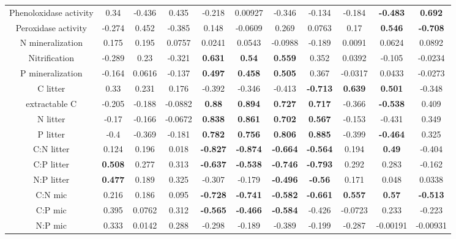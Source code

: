 \documentclass[authoryear,preprint,review,12pt]{elsarticle}
\begin{document}
\begin{table}[h!]
\begin{center}
{\begin{tabular}{ccccccccccc}
  Phenoloxidase activity & 0.34 & -0.436 & 0.435 & -0.218 & 0.00927 & -0.346 & -0.134 & -0.184 & \textbf{ -0.483 } & \textbf{ 0.692 } \\ 
  Peroxidase activity & -0.274 & 0.452 & -0.385 & 0.148 & -0.0609 & 0.269 & 0.0763 & 0.17 & \textbf{ 0.546 } & \textbf{ -0.708 } \\ 
  N mineralization & 0.175 & 0.195 & 0.0757 & 0.0241 & 0.0543 & -0.0988 & -0.189 & 0.0091 & 0.0624 & 0.0892 \\ 
  Nitrification & -0.289 & 0.23 & -0.321 & \textbf{ 0.631 } & \textbf{ 0.54 } & \textbf{ 0.559 } & 0.352 & 0.0392 & -0.105 & -0.0234 \\ 
  P mineralization & -0.164 & 0.0616 & -0.137 & \textbf{ 0.497 } & \textbf{ 0.458 } & \textbf{ 0.505 } & 0.367 & -0.0317 & 0.0433 & -0.0273 \\ 
  C litter & 0.33 & 0.231 & 0.176 & -0.392 & -0.346 & -0.413 & \textbf{ -0.713 } & \textbf{ 0.639 } & \textbf{ 0.501 } & -0.348 \\ 
  extractable C & -0.205 & -0.188 & -0.0882 & \textbf{ 0.88 } & \textbf{ 0.894 } & \textbf{ 0.727 } & \textbf{ 0.717 } & -0.366 & \textbf{ -0.538 } & 0.409 \\ 
  N litter & -0.17 & -0.166 & -0.0672 & \textbf{ 0.838 } & \textbf{ 0.861 } & \textbf{ 0.702 } & \textbf{ 0.567 } & -0.153 & -0.431 & 0.349 \\ 
  P litter & -0.4 & -0.369 & -0.181 & \textbf{ 0.782 } & \textbf{ 0.756 } & \textbf{ 0.806 } & \textbf{ 0.885 } & -0.399 & \textbf{ -0.464 } & 0.325 \\ 
  C:N litter & 0.124 & 0.196 & 0.018 & \textbf{ -0.827 } & \textbf{ -0.874 } & \textbf{ -0.664 } & \textbf{ -0.564 } & 0.194 & \textbf{ 0.49 } & -0.404 \\ 
  C:P litter & \textbf{ 0.508 } & 0.277 & 0.313 & \textbf{ -0.637 } & \textbf{ -0.538 } & \textbf{ -0.746 } & \textbf{ -0.793 } & 0.292 & 0.283 & -0.162 \\ 
  N:P litter & \textbf{ 0.477 } & 0.189 & 0.325 & -0.307 & -0.179 & \textbf{ -0.496 } & \textbf{ -0.56 } & 0.171 & 0.048 & 0.0338 \\ 
  C:N mic & 0.216 & 0.186 & 0.095 & \textbf{ -0.728 } & \textbf{ -0.741 } & \textbf{ -0.582 } & \textbf{ -0.661 } & \textbf{ 0.557 } & \textbf{ 0.57 } & \textbf{ -0.513 } \\ 
  C:P mic & 0.395 & 0.0762 & 0.312 & \textbf{ -0.565 } & \textbf{ -0.466 } & \textbf{ -0.584 } & -0.426 & -0.0723 & 0.233 & -0.223 \\ 
  N:P mic & 0.333 & 0.0142 & 0.288 & -0.298 & -0.189 & -0.389 & -0.199 & -0.287 & -0.00191 & -0.00931 \\ 

\end{tabular}}
\end{center}
\end{table}
\end{document}
